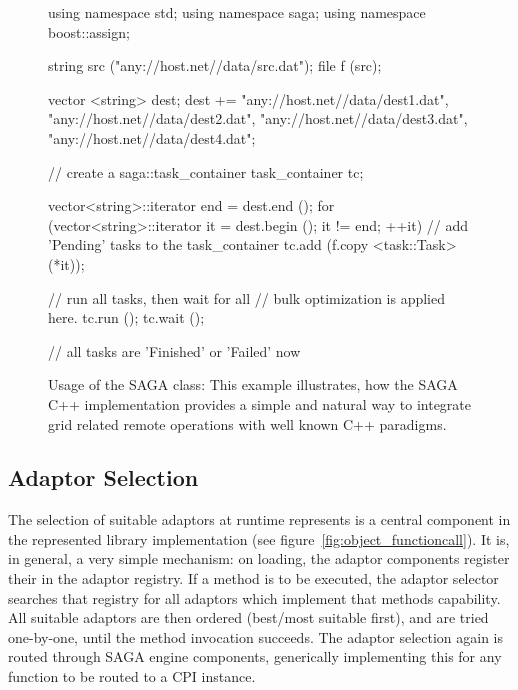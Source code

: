 \begin{figure}[!ht]
 \begin{center}
  \begin{mycode}[label=Usage of SAGA task\_container]
  {
    using namespace std;
    using namespace saga;
    using namespace boost::assign;

    string src ("any://host.net//data/src.dat");
    file   f   (src);

    vector <string> dest;
    dest += "any://host.net//data/dest1.dat",
            "any://host.net//data/dest2.dat",
            "any://host.net//data/dest3.dat",
            "any://host.net//data/dest4.dat";

    // create a saga::task_container
    task_container tc;

    vector<string>::iterator end = dest.end ();
    for (vector<string>::iterator it = dest.begin (); 
         it != end; ++it)
    {
      // add 'Pending' tasks to the task_container
      tc.add (f.copy <task::Task> (*it));
    }
    
    // run all tasks, then wait for all
    // bulk optimization is applied here.
    tc.run  ();
    tc.wait ();

    // all tasks are 'Finished' or 'Failed' now
  }
  \end{mycode}
  \up
  \up
  \caption{\label{src:taskcontainer}
    Usage of the SAGA  class: This example 
    illustrates, how the SAGA C++ implementation provides a 
    simple and natural way to integrate grid related remote
    operations with well known C++ paradigms.}
 \end{center}
\end{figure}


\subsection{Adaptor Selection}

The selection of suitable adaptors at runtime represents is a central
component in the represented library implementation (see
figure~\ref{fig:object_functioncall}).  It is, in general, a very simple
mechanism: on loading, the adaptor components register their
 in the adaptor registry.  If a method is to be
executed, the adaptor selector searches that registry for all adaptors
which implement that methods capability.  All suitable adaptors are
then ordered (best/most suitable first), and are tried one-by-one,
until the method invocation succeeds. The adaptor selection again is 
routed through SAGA engine components, generically implementing this for 
any function to be routed to a CPI instance.

